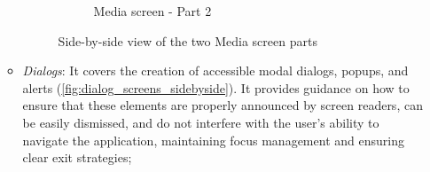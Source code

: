 \begin{enumerate}
\begin{itemize}
\begin{figure}[ht]
\begin{subfigure}[b]{0.48\textwidth}
                \caption{Media screen - Part 2}
                \label{fig:media-right}
            \end{subfigure}
            \caption{Side-by-side view of the two Media screen parts}
            \label{fig:media_screens_sidebyside}
        \end{figure}

        \item \textit{Dialogs}: It covers the creation of accessible modal dialogs, popups, and alerts (\ref{fig:dialog_screens_sidebyside}). It provides guidance on how to ensure that these elements are properly announced by screen readers, can be easily dismissed, and do not interfere with the user's ability to navigate the application, maintaining focus management and ensuring clear exit strategies;

        \begin{figure}[ht]
            \centering
            \begin{subfigure}[b]{0.48\textwidth}
                \centering

\end{subfigure}
\end{figure}
\end{itemize}
\end{enumerate}
